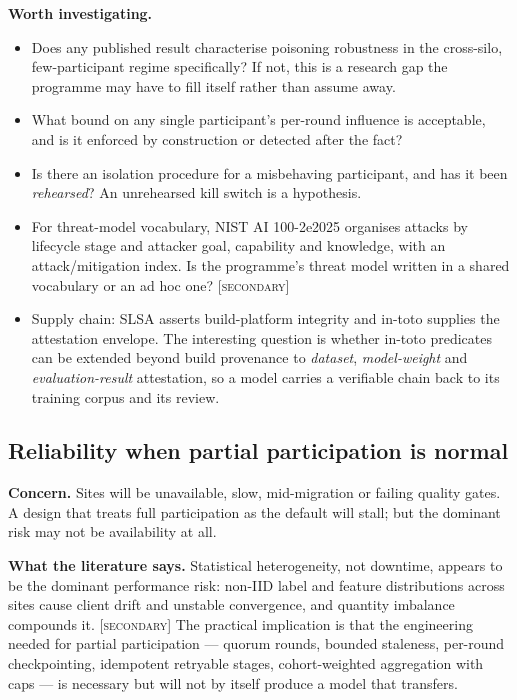 \documentclass[11pt,a4paper]{article}
\newcommand{\secondary}{\textsc{[secondary]}}
\newcommand{\concern}[1]{\par\medskip\noindent\textbf{Concern.} #1}
\newcommand{\evidence}[1]{\par\smallskip\noindent\textbf{What the literature says.} #1}
\newcommand{\investigate}{\par\smallskip\noindent\textbf{Worth investigating.}}
\begin{document}
\investigate
\begin{itemize}
  \item Does any published result characterise poisoning robustness in the
  cross-silo, few-participant regime specifically? If not, this is a
  research gap the programme may have to fill itself rather than assume
  away.
  \item What bound on any single participant's per-round influence is
  acceptable, and is it enforced by construction or detected after the
  fact?
  \item Is there an isolation procedure for a misbehaving participant, and
  has it been \emph{rehearsed}? An unrehearsed kill switch is a hypothesis.
  \item For threat-model vocabulary, NIST AI 100-2e2025
  \citep{nistai1002} organises attacks by lifecycle stage and attacker
  goal, capability and knowledge, with an attack/mitigation index. Is the
  programme's threat model written in a shared vocabulary or an ad hoc one?
  \secondary
  \item Supply chain: SLSA \citep{slsa} asserts build-platform integrity and
  in-toto \citep{intoto} supplies the attestation envelope. The interesting
  question is whether in-toto predicates can be extended beyond build
  provenance to \emph{dataset}, \emph{model-weight} and
  \emph{evaluation-result} attestation, so a model carries a verifiable
  chain back to its training corpus and its review.
\end{itemize}

\subsection{Reliability when partial participation is normal}
\label{sec:reliability}

\concern{Sites will be unavailable, slow, mid-migration or failing quality
gates. A design that treats full participation as the default will stall;
but the dominant risk may not be availability at all.}

\evidence{Statistical heterogeneity, not downtime, appears to be the
dominant performance risk: non-IID label and feature distributions across
sites cause client drift and unstable convergence, and quantity imbalance
compounds it. \secondary{} The practical implication is that the engineering
needed for partial participation --- quorum rounds, bounded staleness,
per-round checkpointing, idempotent retryable stages, cohort-weighted
aggregation with caps --- is necessary but will not by itself produce a
model that transfers.}
\end{document}
